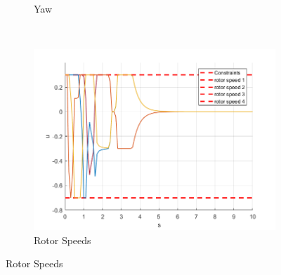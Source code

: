 \documentclass[11pt]{article}
\begin{document}
\begin{enumerate}
\begin{figure}[ht]
\begin{subfigure}[c]{0.3\linewidth}
            \caption{Yaw}
        \end{subfigure}
        ~
        \begin{subfigure}[c]{0.3\linewidth}
            \centering
            \includegraphics[width=\linewidth]{Plots_05_ReferenceTracking_Constant/03}
            \caption{Rotor Speeds}
        \end{subfigure}


\end{figure}
\end{enumerate}
\end{document}
